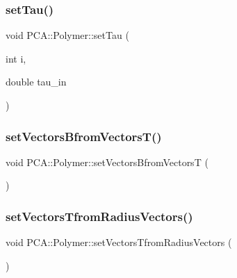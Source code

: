 \hypertarget{class_p_c_a_1_1_polymer_a4ac116507767651444c852a75ab79c2d}{}\label{class_p_c_a_1_1_polymer_a4ac116507767651444c852a75ab79c2d} 
\subsubsection{\texorpdfstring{set\+Tau()}{setTau()}}
{\footnotesize\ttfamily void P\+C\+A\+::\+Polymer\+::set\+Tau (\begin{DoxyParamCaption}\item[{int}]{i,  }\item[{double}]{tau\+\_\+in }\end{DoxyParamCaption})\hspace{0.3cm}{\ttfamily [inline]}}

\hypertarget{class_p_c_a_1_1_polymer_a8dad939cbc8d8df73784526ad4a07aef}{}\label{class_p_c_a_1_1_polymer_a8dad939cbc8d8df73784526ad4a07aef} 
\subsubsection{\texorpdfstring{set\+Vectors\+Bfrom\+Vectors\+T()}{setVectorsBfromVectorsT()}}
{\footnotesize\ttfamily void P\+C\+A\+::\+Polymer\+::set\+Vectors\+Bfrom\+VectorsT (\begin{DoxyParamCaption}{ }\end{DoxyParamCaption})}

\hypertarget{class_p_c_a_1_1_polymer_aa655eb1299b272fef8c91f003abbf50d}{}\label{class_p_c_a_1_1_polymer_aa655eb1299b272fef8c91f003abbf50d} 
\subsubsection{\texorpdfstring{set\+Vectors\+Tfrom\+Radius\+Vectors()}{setVectorsTfromRadiusVectors()}}
{\footnotesize\ttfamily void P\+C\+A\+::\+Polymer\+::set\+Vectors\+Tfrom\+Radius\+Vectors (\begin{DoxyParamCaption}{ }\end{DoxyParamCaption})}

